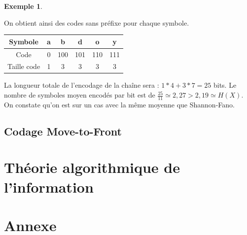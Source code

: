 \documentclass[10pt,a4paper]{article}
\theoremstyle{definition}
\newtheorem{example}{Exemple}
\numberwithin{lemma}{subsection}
\numberwithin{theorem}{subsection}
\numberwithin{definition}{subsection}
\numberwithin{proposition}{subsection}
\numberwithin{corollary}{subsection}
\numberwithin{property}{subsection}
\numberwithin{example}{subsection}
\numberwithin{heuristique}{subsection}
\numberwithin{scenario}{subsection}
\begin{document}
\begin{example}
\begin{itemize}
\begin{center}
\end{center}
\end{itemize}
On obtient ainsi des codes sans préfixe pour chaque symbole.
\par\begin{tabular}{|c|c|c|c|c|c|}
\hline
Symbole & a & b & d & o & y \\
\hline
Code & 0 & 100 & 101 & 110 & 111 \\
\hline
Taille code & 1 & 3 & 3 & 3 & 3 \\
\hline
\end{tabular}
\par La longueur totale de l'encodage de la chaîne sera : $1*4 + 3*7 = 25$ bits. Le nombre de symboles moyen encodés par bit est de $\frac{25}{11} \simeq 2,27 > 2,19 \simeq H(X)$. On constate qu'on est sur un cas avec la même moyenne que Shannon-Fano.
\end{example}

	\subsection{Codage Move-to-Front}
	
		

\section{Théorie algorithmique de l'information}
	
	

\section*{Annexe}
\end{document}
